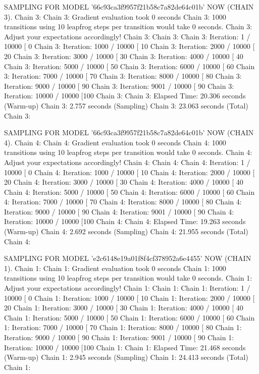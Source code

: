\documentclass[
]{jss}
\begin{document}
\begin{CodeChunk}
\begin{CodeOutput}
SAMPLING FOR MODEL '66c93ca3f9957f21b58c7a82de64c01b' NOW (CHAIN 3).
Chain 3: 
Chain 3: Gradient evaluation took 0 seconds
Chain 3: 1000 transitions using 10 leapfrog steps per transition would take 0 seconds.
Chain 3: Adjust your expectations accordingly!
Chain 3: 
Chain 3: 
Chain 3: Iteration:    1 / 10000 [  0%
Chain 3: Iteration: 1000 / 10000 [ 10%
Chain 3: Iteration: 2000 / 10000 [ 20%
Chain 3: Iteration: 3000 / 10000 [ 30%
Chain 3: Iteration: 4000 / 10000 [ 40%
Chain 3: Iteration: 5000 / 10000 [ 50%
Chain 3: Iteration: 6000 / 10000 [ 60%
Chain 3: Iteration: 7000 / 10000 [ 70%
Chain 3: Iteration: 8000 / 10000 [ 80%
Chain 3: Iteration: 9000 / 10000 [ 90%
Chain 3: Iteration: 9001 / 10000 [ 90%
Chain 3: Iteration: 10000 / 10000 [100%
Chain 3: 
Chain 3:  Elapsed Time: 20.306 seconds (Warm-up)
Chain 3:                2.757 seconds (Sampling)
Chain 3:                23.063 seconds (Total)
Chain 3: 

SAMPLING FOR MODEL '66c93ca3f9957f21b58c7a82de64c01b' NOW (CHAIN 4).
Chain 4: 
Chain 4: Gradient evaluation took 0 seconds
Chain 4: 1000 transitions using 10 leapfrog steps per transition would take 0 seconds.
Chain 4: Adjust your expectations accordingly!
Chain 4: 
Chain 4: 
Chain 4: Iteration:    1 / 10000 [  0%
Chain 4: Iteration: 1000 / 10000 [ 10%
Chain 4: Iteration: 2000 / 10000 [ 20%
Chain 4: Iteration: 3000 / 10000 [ 30%
Chain 4: Iteration: 4000 / 10000 [ 40%
Chain 4: Iteration: 5000 / 10000 [ 50%
Chain 4: Iteration: 6000 / 10000 [ 60%
Chain 4: Iteration: 7000 / 10000 [ 70%
Chain 4: Iteration: 8000 / 10000 [ 80%
Chain 4: Iteration: 9000 / 10000 [ 90%
Chain 4: Iteration: 9001 / 10000 [ 90%
Chain 4: Iteration: 10000 / 10000 [100%
Chain 4: 
Chain 4:  Elapsed Time: 19.263 seconds (Warm-up)
Chain 4:                2.692 seconds (Sampling)
Chain 4:                21.955 seconds (Total)
Chain 4: 

SAMPLING FOR MODEL 'e2c6148e19a01f8f4cf378952a6e4455' NOW (CHAIN 1).
Chain 1: 
Chain 1: Gradient evaluation took 0 seconds
Chain 1: 1000 transitions using 10 leapfrog steps per transition would take 0 seconds.
Chain 1: Adjust your expectations accordingly!
Chain 1: 
Chain 1: 
Chain 1: Iteration:    1 / 10000 [  0%
Chain 1: Iteration: 1000 / 10000 [ 10%
Chain 1: Iteration: 2000 / 10000 [ 20%
Chain 1: Iteration: 3000 / 10000 [ 30%
Chain 1: Iteration: 4000 / 10000 [ 40%
Chain 1: Iteration: 5000 / 10000 [ 50%
Chain 1: Iteration: 6000 / 10000 [ 60%
Chain 1: Iteration: 7000 / 10000 [ 70%
Chain 1: Iteration: 8000 / 10000 [ 80%
Chain 1: Iteration: 9000 / 10000 [ 90%
Chain 1: Iteration: 9001 / 10000 [ 90%
Chain 1: Iteration: 10000 / 10000 [100%
Chain 1: 
Chain 1:  Elapsed Time: 21.468 seconds (Warm-up)
Chain 1:                2.945 seconds (Sampling)
Chain 1:                24.413 seconds (Total)
Chain 1: 


\end{CodeOutput}
\end{CodeChunk}
\end{document}

